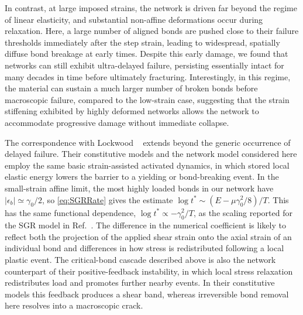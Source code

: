 In contrast, at large imposed strains, the network is driven far beyond the regime of linear elasticity, and substantial non-affine deformations occur during relaxation. Here, a large number of aligned bonds are pushed close to their failure thresholds immediately after the step strain, leading to widespread, spatially diffuse bond breakage at early times. Despite this early damage, we found that networks can still exhibit ultra-delayed failure, persisting essentially intact for many decades in time before ultimately fracturing. Interestingly, in this regime, the material can sustain a much larger number of broken bonds before macroscopic failure, compared to the low-strain case, suggesting that the strain stiffening exhibited by highly deformed networks allows the network to accommodate progressive damage without immediate collapse.

The correspondence with Lockwood \etal~\cite{lockwood_ultradelayed_2025} extends beyond the generic occurrence of delayed failure. Their constitutive models and the network model considered here employ the same basic strain-assisted activated dynamics, in which stored local elastic energy lowers the barrier to a yielding or bond-breaking event. In the small-strain affine limit, the most highly loaded bonds in our network have $|\epsilon_b|\simeq\gamma_0/2$, so \cref{eq:SGRRate} gives the estimate $\log t^*\sim(E-\mu\gamma_0^2/8)/T$. This has the same functional dependence, $\log t^*\propto-\gamma_0^2/T$, as the scaling reported for the SGR model in Ref.~\cite{lockwood_ultradelayed_2025}. The difference in the numerical coefficient is likely to reflect both the projection of the applied shear strain onto the axial strain of an individual bond and differences in how stress is redistributed following a local plastic event. The critical-bond cascade described above is also the network counterpart of their positive-feedback instability, in which local stress relaxation redistributes load and promotes further nearby events. In their constitutive models this feedback produces a shear band, whereas irreversible bond removal here resolves into a macroscopic crack.

